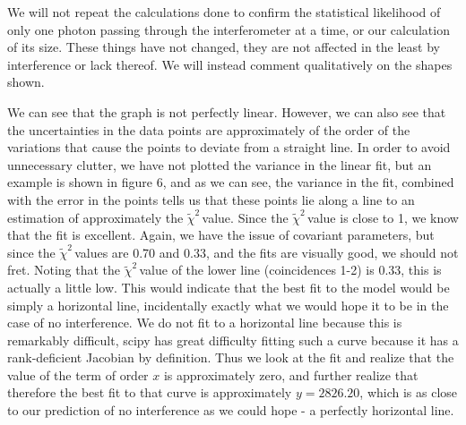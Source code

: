 \documentclass{article}
\newcommand{\redchi}{$\tilde{\chi}^2\,$}
\begin{document}
We will not repeat the calculations done to confirm the statistical likelihood of only one photon passing through the interferometer at a time, or our calculation of its size.  These things have not changed, they are not affected in the least by interference or lack thereof.  We will instead comment qualitatively on the shapes shown.

\hspace{.5cm}

We can see that the graph is not perfectly linear.  However, we can also see that the uncertainties in the data points are approximately of the order of the variations that cause the points to deviate from a straight line.  In order to avoid unnecessary clutter, we have not plotted the variance in the linear fit, but an example is shown in figure 6, and as we can see, the variance in the fit, combined with the error in the points tells us that these points lie along a line to an estimation of approximately the \redchi value.  Since the \redchi value is close to 1, we know that the fit is excellent.  Again, we have the issue of covariant parameters, but since the \redchi values are 0.70 and 0.33, and the fits are visually good, we should not fret.  Noting that the \redchi value of the lower line (coincidences 1-2) is 0.33, this is actually a little low.  This would indicate that the best fit to the model would be simply a horizontal line, incidentally exactly what we would hope it to be in the case of no interference.  We do not fit to a horizontal line because this is remarkably difficult, scipy has great difficulty fitting such a curve because it has a rank-deficient Jacobian by definition.  Thus we look at the fit and realize that the value of the term of order $x$ is approximately zero, and further realize that therefore the best fit to that curve is approximately $y = 2826.20$, which is as close to our prediction of no interference as we could hope - a perfectly horizontal line.
\end{document}
